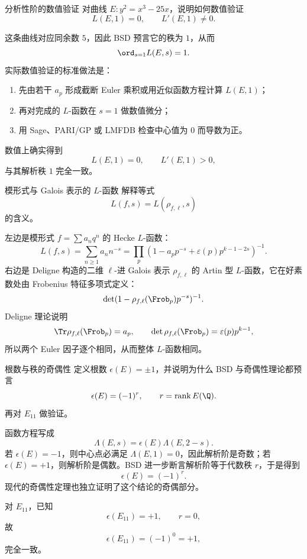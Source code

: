 \begin{problem}{分析性阶的数值验证 \medium}
对曲线 $E:y^2=x^3-25x$，说明如何数值验证
\[
L(E,1)=0,
\qquad L'(E,1)\neq 0.
\]
\end{problem}
\begin{solution}
这条曲线对应同余数 $5$，因此 BSD 预言它的秩为 $1$，从而
\[
\ord_{s=1}L(E,s)=1.
\]
实际数值验证的标准做法是：
\begin{enumerate}[label=\arabic*.]
  \item 先由若干 $a_p$ 形成截断 Euler 乘积或用近似函数方程计算 $L(E,1)$；
  \item 再对完成的 $L$-函数在 $s=1$ 做数值微分；
  \item 用 Sage、PARI/GP 或 LMFDB 检查中心值为 $0$ 而导数为正。
\end{enumerate}
数值上确实得到
\[
L(E,1)=0,
\qquad L'(E,1)>0,
\]
与其解析秩 $1$ 完全一致。
\end{solution}

\begin{problem}{模形式与 Galois 表示的 $L$-函数 \medium}
解释等式
\[
L(f,s)=L(\rho_{f,\ell},s)
\]
的含义。
\end{problem}
\begin{solution}
左边是模形式 $f=\sum a_nq^n$ 的 Hecke $L$-函数：
\[
L(f,s)=\sum_{n\ge1}a_nn^{-s}=\prod_p(1-a_pp^{-s}+\varepsilon(p)p^{k-1-2s})^{-1}.
\]
右边是 Deligne 构造的二维 $\ell$-进 Galois 表示 $\rho_{f,\ell}$ 的 Artin 型 $L$-函数，它在好素数处由 Frobenius 特征多项式定义：
\[
\det(1-\rho_{f,\ell}(\Frob_p)p^{-s})^{-1}.
\]
Deligne 理论说明
\[
\Tr\rho_{f,\ell}(\Frob_p)=a_p,
\qquad
\det\rho_{f,\ell}(\Frob_p)=\varepsilon(p)p^{k-1},
\]
所以两个 Euler 因子逐个相同，从而整体 $L$-函数相同。
\end{solution}

\begin{problem}{根数与秩的奇偶性 \medium}
定义根数 $\epsilon(E)=\pm1$，并说明为什么 BSD 与奇偶性理论都预言
\[
\epsilon(E)=(-1)^r,
\qquad r=\mathrm{rank}\,E(\Q).
\]
再对 $E_{11}$ 做验证。
\end{problem}
\begin{solution}
函数方程写成
\[
\Lambda(E,s)=\epsilon(E)\Lambda(E,2-s).
\]
若 $\epsilon(E)=-1$，则中心点必满足 $\Lambda(E,1)=0$，因此解析阶是奇数；若 $\epsilon(E)=+1$，则解析阶是偶数。BSD 进一步断言解析阶等于代数秩 $r$，于是得到
\[
\epsilon(E)=(-1)^r.
\]
现代的奇偶性定理也独立证明了这个结论的奇偶部分。

对 $E_{11}$，已知
\[
\epsilon(E_{11})=+1,
\qquad r=0,
\]
故
\[
\epsilon(E_{11})=(-1)^0=+1,
\]
完全一致。
\end{solution}


